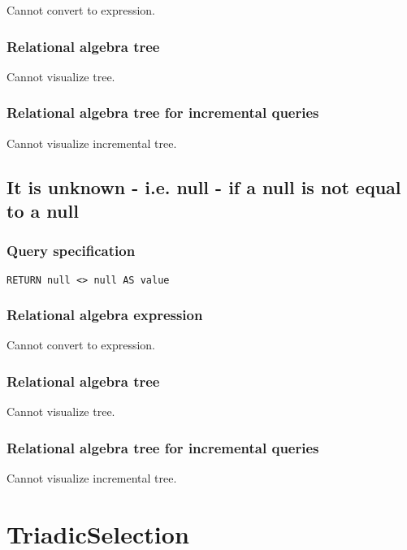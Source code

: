 Cannot convert to expression.

\subsubsection*{Relational algebra tree}

Cannot visualize tree.

\subsubsection*{Relational algebra tree for incremental queries}

Cannot visualize incremental tree.

\subsection{It is unknown - i.e. null - if a null is not equal to a null}

\subsubsection*{Query specification}

\begin{lstlisting}
RETURN null <> null AS value
\end{lstlisting}

\subsubsection*{Relational algebra expression}

Cannot convert to expression.

\subsubsection*{Relational algebra tree}

Cannot visualize tree.

\subsubsection*{Relational algebra tree for incremental queries}

Cannot visualize incremental tree.

\section{TriadicSelection}

